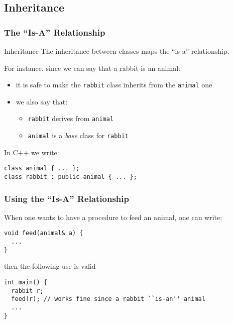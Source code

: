 \documentclass{beamer}
\newcommand{\cpp}{{C++}\xspace}
\newcommand{\code}[1]{{\scriptsize{\texttt{#1}}}\xspace}
\begin{document}
\subsection{Inheritance}


\begin{frame}[fragile]
  \frametitle{The ``Is-A'' Relationship}

  \begin{block}{Inheritance}
    The inheritance between classes maps the ``is-a'' relationship.
  \end{block}

For instance, since we can say that a rabbit is an animal:
\begin{itemize}
\item it is safe to make the \code{rabbit} class inherits from the
  \code{animal} one
\item we also say that:
  \begin{itemize}
  \item \code{rabbit} derives from \code{animal}
  \item \code{animal} is a \emph{base} class for \code{rabbit}
  \end{itemize}
\end{itemize}

In \cpp we write:
\begin{lstlisting}
class animal { ... };
class rabbit : public animal { ... };
\end{lstlisting}

\end{frame}



\begin{frame}[fragile]
  \frametitle{Using the ``Is-A'' Relationship}

  When one wants to have a procedure to feed an animal, one can write:

\begin{lstlisting}
void feed(animal& a) {
  ...
}
\end{lstlisting}

then the following use is valid 
\begin{lstlisting}
int main() {
  rabbit r;
  feed(r); // works fine since a rabbit ``is-an'' animal
  ...
}
\end{lstlisting}

\end{frame}
\end{document}
